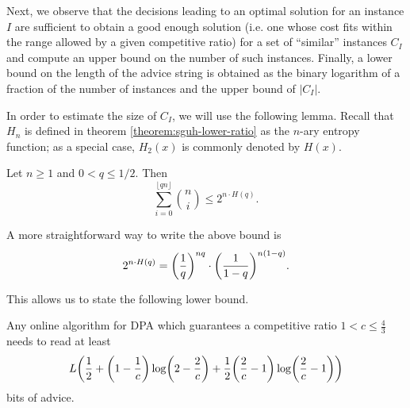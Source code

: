Next, we observe that the decisions leading to an optimal solution for an
instance $I$ are sufficient to obtain a good enough solution (i.e. one
whose cost fits within the range allowed by a given competitive ratio) for
a set of ``similar'' instances $C_I$ and compute an upper bound on the
number of such instances. Finally, a lower bound on the length of the
advice string is obtained as the binary logarithm of a fraction of the
number of instances and the upper bound of $|C_I|$.

In order to estimate the size of $C_I$, we will use the following lemma.
Recall that $H_n$ is defined in theorem \ref{theorem:sguh-lower-ratio} as
the $n$-ary entropy function; as a special case, $H_2(x)$ is commonly
denoted by $H(x)$.

\begin{lemma}\label{lemma:hamming}
    Let $n \geq 1$ and $0 < q \leq 1/2$. Then
    $$
        \sum_{i=0}^{\lfloor{}qn\rfloor} \binom{n}{i} \leq
        2^{n\cdot{}H(q)}.
    $$
\end{lemma}

A more straightforward way to write the above bound is
$$
    2^{n\cdot{}H(q)} = \paren*{\frac{1}{q}}^{nq} \cdot
    \paren*{\frac{1}{1-q}}^{n(1-q)}.
$$

This allows us to state the following lower bound.

\begin{theorem}\label{theorem:dpa-lower-bound-half}
    Any online algorithm for DPA which guarantees a competitive ratio $1 <
    c \leq \frac{4}{3}$ needs to read at least
    $$
        L \paren*{\frac{1}{2} +
        \paren*{1-\frac{1}{c}}\log\paren*{2-\frac{2}{c}} +
        \frac{1}{2}\paren*{\frac{2}{c}-1}\log\paren*{\frac{2}{c}-1}}
    $$
    bits of advice.
\end{theorem}

